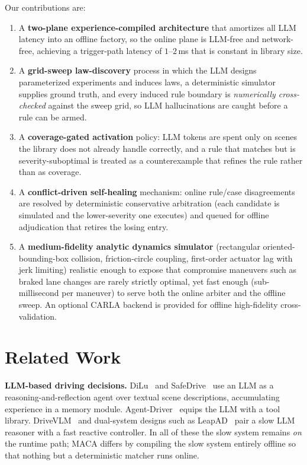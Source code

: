 \documentclass[conference]{IEEEtran}
\begin{document}
Our contributions are:
\begin{enumerate}
\item A \textbf{two-plane experience-compiled architecture} that amortizes
all LLM latency into an offline factory, so the online plane is LLM-free and
network-free, achieving a trigger-path latency of $1$--$2$\,ms that is
constant in library size.
\item A \textbf{grid-sweep law-discovery} process in which the LLM designs
parameterized experiments and induces laws, a deterministic simulator
supplies ground truth, and every induced rule boundary is
\emph{numerically cross-checked} against the sweep grid, so LLM
hallucinations are caught before a rule can be armed.
\item A \textbf{coverage-gated activation} policy: LLM tokens are spent only
on scenes the library does not already handle correctly, and a rule that
matches but is severity-suboptimal is treated as a counterexample that
refines the rule rather than as coverage.
\item A \textbf{conflict-driven self-healing} mechanism: online rule/case
disagreements are resolved by deterministic conservative arbitration (each
candidate is simulated and the lower-severity one executes) and queued for
offline adjudication that retires the losing entry.
\item A \textbf{medium-fidelity analytic dynamics simulator} (rectangular
oriented-bounding-box collision, friction-circle coupling, first-order
actuator lag with jerk limiting) realistic enough to expose that compromise
maneuvers such as braked lane changes are rarely strictly optimal, yet fast
enough (sub-millisecond per maneuver) to serve both the online arbiter and
the offline sweep. An optional CARLA backend is provided for offline
high-fidelity cross-validation.
\end{enumerate}

\section{Related Work}

\textbf{LLM-based driving decisions.} DiLu~\cite{dilu} and
SafeDrive~\cite{safedrive} use an LLM as a reasoning-and-reflection agent
over textual scene descriptions, accumulating experience in a memory module.
Agent-Driver~\cite{agentdriver} equips the LLM with a tool library.
DriveVLM~\cite{drivevlm} and dual-system designs such as
LeapAD~\cite{leapad} pair a slow LLM reasoner with a fast reactive
controller. In all of these the slow system remains \emph{on} the runtime
path; MACA differs by compiling the slow system entirely offline so that
nothing but a deterministic matcher runs online.
\end{document}
